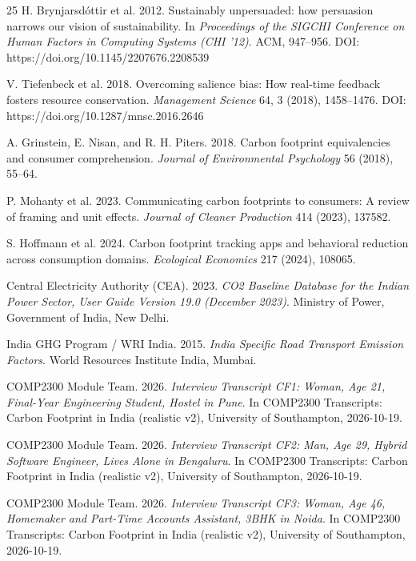 \documentclass[12pt, a4paper]{article}
\begin{document}
\begin{thebibliography}{25}
H. Brynjarsd\'{o}ttir et al. 2012. Sustainably unpersuaded: how persuasion narrows our vision of sustainability. In \textit{Proceedings of the SIGCHI Conference on Human Factors in Computing Systems (CHI '12)}. ACM, 947--956. DOI: https://doi.org/10.1145/2207676.2208539

V. Tiefenbeck et al. 2018. Overcoming salience bias: How real-time feedback fosters resource conservation. \textit{Management Science} 64, 3 (2018), 1458--1476. DOI: https://doi.org/10.1287/mnsc.2016.2646

A. Grinstein, E. Nisan, and R. H. Piters. 2018. Carbon footprint equivalencies and consumer comprehension. \textit{Journal of Environmental Psychology} 56 (2018), 55--64.

P. Mohanty et al. 2023. Communicating carbon footprints to consumers: A review of framing and unit effects. \textit{Journal of Cleaner Production} 414 (2023), 137582.

S. Hoffmann et al. 2024. Carbon footprint tracking apps and behavioral reduction across consumption domains. \textit{Ecological Economics} 217 (2024), 108065.

Central Electricity Authority (CEA). 2023. \textit{CO2 Baseline Database for the Indian Power Sector, User Guide Version 19.0 (December 2023)}. Ministry of Power, Government of India, New Delhi.

India GHG Program / WRI India. 2015. \textit{India Specific Road Transport Emission Factors}. World Resources Institute India, Mumbai.

COMP2300 Module Team. 2026. \textit{Interview Transcript CF1: Woman, Age 21, Final-Year Engineering Student, Hostel in Pune}. In COMP2300 Transcripts: Carbon Footprint in India (realistic v2), University of Southampton, 2026-10-19.

COMP2300 Module Team. 2026. \textit{Interview Transcript CF2: Man, Age 29, Hybrid Software Engineer, Lives Alone in Bengaluru}. In COMP2300 Transcripts: Carbon Footprint in India (realistic v2), University of Southampton, 2026-10-19.

COMP2300 Module Team. 2026. \textit{Interview Transcript CF3: Woman, Age 46, Homemaker and Part-Time Accounts Assistant, 3BHK in Noida}. In COMP2300 Transcripts: Carbon Footprint in India (realistic v2), University of Southampton, 2026-10-19.


\end{thebibliography}
\end{document}
